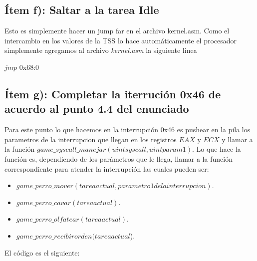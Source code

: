 \subsection{Ítem f): Saltar a la tarea Idle}
Esto es simplemente hacer un jump far en el archivo kernel.asm. Como el intercambio en los valores de la TSS lo hace automáticamente el procesador simplemente agregamos al archivo \textit{kernel.asm} la siguiente linea\\
 \begin{center}
 $jmp$ 0x68:0 \\
 \end{center}

 \subsection{Ítem g): Completar la iterrución 0x46 de acuerdo al punto 4.4 del enunciado}
Para este punto lo que hacemos en la interrupción 0x46 es pushear en la pila los parametros de la interrupcion que llegan en los registros $EAX$ y $ECX$ y llamar a la función $game\_syscall\_manejar(uint syscall, uint param1)$. Lo que hace la función es, dependiendo de los parámetros que le llega, llamar a la función correspondiente para atender la interrupción las cuales pueden ser:\\

\begin{itemize}

\item $game\_perro\_mover(tarea actual, parametro 1 de la interrupcion)$.
\item $game\_perro\_cavar(tarea actual)$.
\item $game\_perro\_olfatear(tarea actual)$.
\item $game\_perro\_recibirorden(tarea actual$).

\end{itemize}

El código es el siguiente:\\


